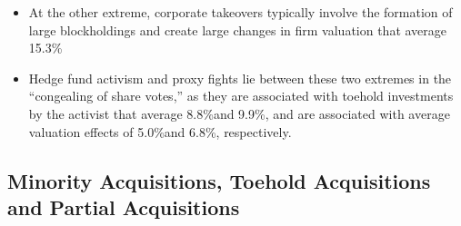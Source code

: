 \documentclass[12pt]{article}
\begin{document}
\begin{itemize}
        \item At the other extreme, corporate takeovers typically involve the formation of large blockholdings and create large changes in firm valuation that average 15.3\% \citep{Denes2017}

        \item Hedge fund activism and proxy fights lie between these two extremes in the “congealing of share votes,” as they are associated with toehold investments by the activist that average 8.8\%and 9.9\%, and are associated with average valuation effects of 5.0\%and 6.8\%, respectively.\citep{Denes2017}

    \end{itemize}

\subsection{Minority Acquisitions, Toehold Acquisitions and Partial Acquisitions}
\end{document}

